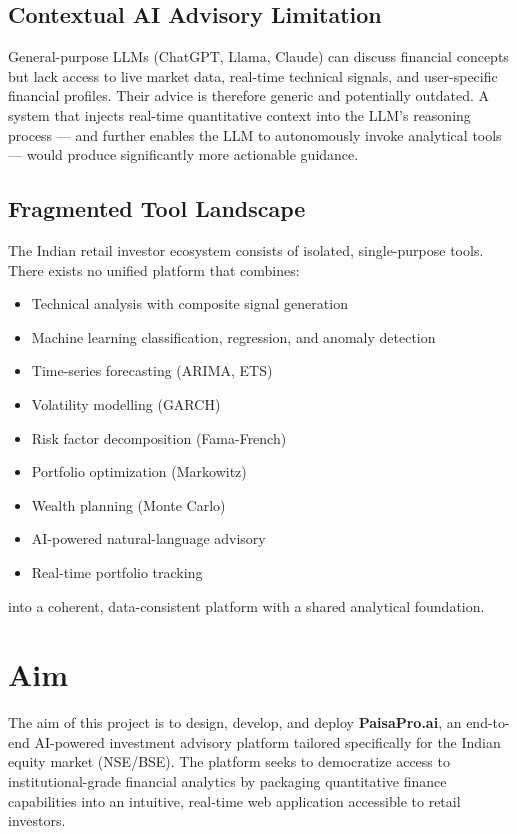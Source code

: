 \documentclass[12pt, a4paper, oneside]{report}
\newcommand{\projectname}{PaisaPro.ai}
\begin{document}
\subsection{Contextual AI Advisory Limitation}

General-purpose LLMs (ChatGPT, Llama, Claude) can discuss financial concepts but lack access to live market data, real-time technical signals, and user-specific financial profiles. Their advice is therefore generic and potentially outdated. A system that injects real-time quantitative context into the LLM's reasoning process --- and further enables the LLM to autonomously invoke analytical tools --- would produce significantly more actionable guidance.

\subsection{Fragmented Tool Landscape}

The Indian retail investor ecosystem consists of isolated, single-purpose tools. There exists no unified platform that combines:
\begin{itemize}[nosep]
    \item Technical analysis with composite signal generation
    \item Machine learning classification, regression, and anomaly detection
    \item Time-series forecasting (ARIMA, ETS)
    \item Volatility modelling (GARCH)
    \item Risk factor decomposition (Fama-French)
    \item Portfolio optimization (Markowitz)
    \item Wealth planning (Monte Carlo)
    \item AI-powered natural-language advisory
    \item Real-time portfolio tracking
\end{itemize}
into a coherent, data-consistent platform with a shared analytical foundation.

\section{Aim}
\label{sec:aim}

The aim of this project is to design, develop, and deploy \textbf{\projectname{}}, an end-to-end AI-powered investment advisory platform tailored specifically for the Indian equity market (NSE/BSE). The platform seeks to democratize access to institutional-grade financial analytics by packaging quantitative finance capabilities into an intuitive, real-time web application accessible to retail investors.
\end{document}
